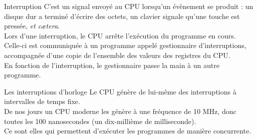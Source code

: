 \documentclass[10pt]{beamer}
\begin{document}
\begin{frame}{Interruption}
C'est un signal envoyé au CPU lorsqu'un évènement se produit : un disque dur a terminé d'écrire des octets, un clavier signale qu'une touche est pressée, \textit{et c\ae tera}.\\

Lors d'une interruption, le CPU arrête l'exécution du programme en cours.\\
Celle-ci est communiquée à un programme appelé \alert{gestionnaire d'interruptions}, accompagnée d'une copie de l'ensemble des valeurs des registres du CPU.\\
En fonction de l'interruption, le gestionnaire passe la main à un autre programme.
\end{frame}
\begin{frame}{Les interruptions d'horloge}
Le CPU génère de lui-même des interruptions à intervalles de temps fixe.\\
De nos jours un CPU moderne les génère à une fréquence de 10 MHz, donc toutes les 100 nanosecondes (un dix-millième de milliseconde).\\

Ce sont elles qui permettent d'exécuter les programmes de manière concurrente.
\end{frame}
\end{document}
